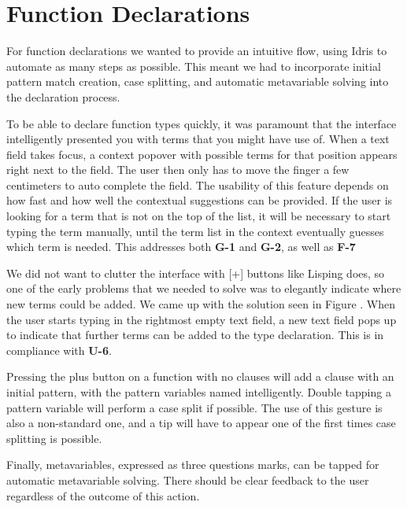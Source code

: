 
\section{Function Declarations}
For function declarations we wanted to provide an intuitive flow, using Idris to automate as many steps as possible. 
This meant we had to incorporate initial pattern match creation, case splitting, and automatic metavariable solving into the declaration process.

To be able to declare function types quickly, it was paramount that the interface intelligently presented you with terms that you might have use of.
When a text field takes focus, a context popover with possible terms for that position appears right next to the field. 
The user then only has to move the finger a few centimeters to auto complete the field. 
The usability of this feature depends on how fast and how well the contextual suggestions can be provided.
If the user is looking for a term that is not on the top of the list, it will be necessary to start typing the term manually, until the term list in the context eventually guesses which term is needed. This addresses both \textbf{G-1} and \textbf{G-2}, as well as \textbf{F-7}


We did not want to clutter the interface with [+] buttons like Lisping does, so one of the early problems that we needed to solve was to elegantly indicate where new terms could be added.
We came up with the solution seen in Figure .
When the user starts typing in the rightmost empty text field, a new text field pops up to indicate that further terms can be added to the type declaration. This is in compliance with \textbf{U-6}.

\missingfigure{}

Pressing the plus button on a function with no clauses will add a clause with an initial pattern, with the pattern variables named intelligently. 
Double tapping a pattern variable will perform a case split if possible. 
The use of this gesture is also a non-standard one, and a tip will have to appear one of the first times case splitting is possible.

Finally, metavariables, expressed as three questions marks, can be tapped for automatic metavariable solving. 
There should be clear feedback to the user regardless of the outcome of this action.

